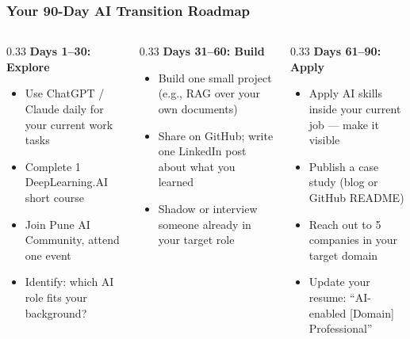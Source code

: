 



\begin{frame}[fragile]\frametitle{Your 90-Day AI Transition Roadmap}
\begin{columns}
    \begin{column}[T]{0.33\linewidth}
\textbf{Days 1--30: Explore}
\begin{itemize}
\item Use ChatGPT / Claude daily for your current work tasks
\item Complete 1 DeepLearning.AI short course
\item Join Pune AI Community, attend one event
\item Identify: which AI role fits your background?
\end{itemize}
    \end{column}
    \begin{column}[T]{0.33\linewidth}
\textbf{Days 31--60: Build}
\begin{itemize}
\item Build one small project (e.g., RAG over your own documents)
\item Share on GitHub; write one LinkedIn post about what you learned
\item Shadow or interview someone already in your target role
\end{itemize}
    \end{column}
    \begin{column}[T]{0.33\linewidth}
\textbf{Days 61--90: Apply}
\begin{itemize}
\item Apply AI skills inside your current job --- make it visible
\item Publish a case study (blog or GitHub README)
\item Reach out to 5 companies in your target domain
\item Update your resume: ``AI-enabled [Domain] Professional''
\end{itemize}
    \end{column}
\end{columns}
\end{frame}



